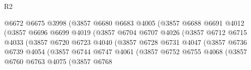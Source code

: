 \begin{lexlean}{R2}
\begin{coremodule}
                                    @6672
                                    @6675
                                    @3998
                                    (@3857
                                      @6680
                                      @6683
                                      @4005
                                      (@3857
                                        @6688
                                        @6691
                                        @4012
                                        (@3857
                                          @6696
                                          @6699
                                          @4019
                                          (@3857
                                            @6704
                                            @6707
                                            @4026
                                            (@3857
                                              @6712
                                              @6715
                                              @4033
                                              (@3857
                                                @6720
                                                @6723
                                                @4040
                                                (@3857
                                                  @6728
                                                  @6731
                                                  @4047
                                                  (@3857
                                                    @6736
                                                    @6739
                                                    @4054
                                                    (@3857
                                                      @6744
                                                      @6747
                                                      @4061
                                                      (@3857
                                                        @6752
                                                        @6755
                                                        @4068
                                                        (@3857
                                                          @6760
                                                          @6763
                                                          @4075
                                                          (@3857
                                                            @6768

\end{coremodule}
\end{lexlean}
